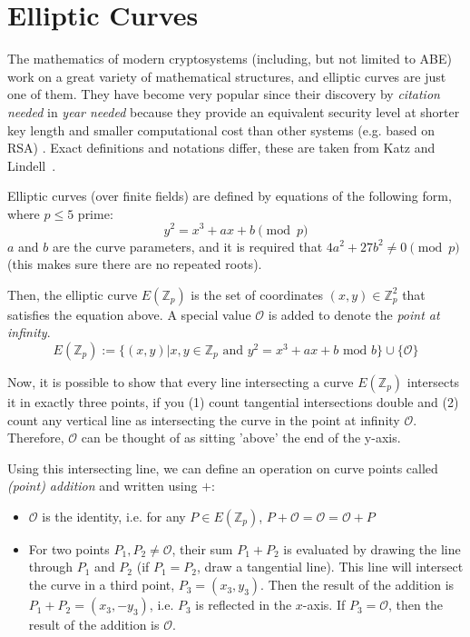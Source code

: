 \section{Elliptic Curves}

The mathematics of modern cryptosystems (including, but not limited to ABE) work on a great variety of mathematical structures, and elliptic curves are just one of them.
They have become very popular since their discovery by \emph{citation needed} in \emph{year needed} because they provide an equivalent security level at shorter key length and smaller computational cost than other systems (e.g. based on RSA) \cite{katz_introduction_2015}.
Exact definitions and notations differ, these are taken from Katz and Lindell~\cite{katz_introduction_2015}.

Elliptic curves (over finite fields) are defined by equations of the following form, where $p \leq 5$ prime: \cite{katz_introduction_2015}
\begin{equation}
    y^2 = x^3 + a x + b \pmod{p}
\end{equation}
$a$ and $b$ are the curve parameters, and it is required that $4a^2 + 27b^2 \neq 0 \pmod{p}$ (this makes sure there are no repeated roots).\cite{katz_introduction_2015}

Then, the elliptic curve $E(\mathbb{Z}_p)$ is the set of coordinates $(x, y) \in \mathbb{Z}_p^2$ that satisfies the equation above. 
A special value $\mathcal{O}$ is added to denote the \emph{point at infinity}. \cite{katz_introduction_2015}
\begin{equation}
    E(\mathbb{Z}_p) := \{(x, y) | x,y \in \mathbb{Z}_p \text{ and } y^2 = x^3 + a x + b \text{ mod } b\} \cup \{\mathcal{O}\}
\end{equation}

Now, it is possible to show that every line intersecting a curve $E(\mathbb{Z}_p)$ intersects it in exactly three points, if you (1) count tangential intersections double and (2) count any vertical line as intersecting the curve in the point at infinity $\mathcal{O}$.
Therefore, $\mathcal{O}$ can be thought of as sitting 'above' the end of the y-axis.\cite{katz_introduction_2015}

Using this intersecting line, we can define an operation on curve points called \emph{(point) addition} and written using $+$: \cite{katz_introduction_2015}

\begin{itemize}
    \item $\mathcal{O}$ is the identity, i.e. for any $P \in E(\mathbb{Z}_p)$, $P + \mathcal{O} = \mathcal{O} = \mathcal{O} + P$ 
    \item For two points $P_1, P_2 \neq \mathcal{O}$, their sum $P_1 + P_2$ is evaluated by drawing the line through $P_1$ and $P_2$ (if $P_1 = P_2$, draw a tangential line). 
        This line will intersect the curve in a third point, $P_3 = (x_3, y_3)$.
        Then the result of the addition is $P_1 + P_2 = (x_3, -y_3)$, i.e. $P_3$ is reflected in the $x$-axis.
        If $P_3 = \mathcal{O}$, then the result of the addition is $\mathcal{O}$.
\end{itemize}

